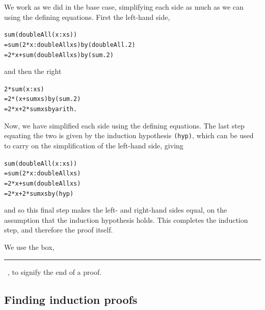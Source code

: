 We work as we did in the base case, simplifying each side as much as we
can using the defining equations. First the left-hand side,
\begin{alltt}
sum (doubleAll (x:xs))
  = sum (2*x : doubleAll xs)\hfill \textrm{by }(doubleAll.2)
  = 2*x + sum (doubleAll xs)\hfill \textrm{by }(sum.2)
\end{alltt}
and then the right
\begin{alltt}
2 * sum (x:xs)
  = 2 * (x + sum xs)\hfill \textrm{by }(sum.2)
  = 2*x + 2 * sum xs\hfill \textrm{by arith.}
\end{alltt}
Now, we have simplified each side using the defining equations. The last
step equating the two is given by the induction hypothesis
\texttt{(hyp)}, which can be used to carry on the simplification of the left-hand side, giving 
\begin{alltt}
sum (doubleAll (x:xs))
  = sum (2*x : doubleAll xs)
  = 2*x + sum (doubleAll xs)
  = 2*x + 2 * sum xs\hfill \textrm{by }(hyp)
\end{alltt}
and so this final step makes the left- and right-hand sides equal, on the
assumption that the induction hypothesis holds. This completes the
induction step, and therefore the proof itself.\blackbox\index{\blackbox@{\rule{8pt}{8pt}}}

\medskip
\noindent
We use the box, \rule{8pt}{8pt}\ , to signify the end of a proof.

\subsection*{Finding induction proofs}

